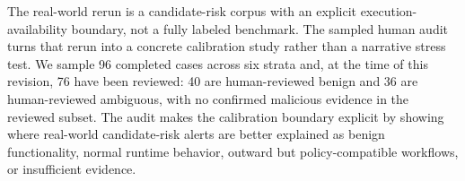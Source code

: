 The real-world rerun is a candidate-risk corpus with an explicit execution-availability boundary, not a fully labeled benchmark. The sampled human audit turns that rerun into a concrete calibration study rather than a narrative stress test. We sample 96 completed cases across six strata and, at the time of this revision, 76 have been reviewed: 40 are human-reviewed benign and 36 are human-reviewed ambiguous, with no confirmed malicious evidence in the reviewed subset. The audit makes the calibration boundary explicit by showing where real-world candidate-risk alerts are better explained as benign functionality, normal runtime behavior, outward but policy-compatible workflows, or insufficient evidence.
